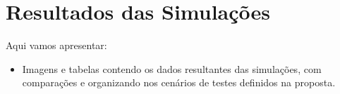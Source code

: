 \chapter{\label{chap:results}Resultados das Simulações}

Aqui vamos apresentar:

\begin{itemize}
\item Imagens e tabelas contendo os dados resultantes das simulações, com comparações e organizando nos cenários de testes definidos na proposta.
\end{itemize}